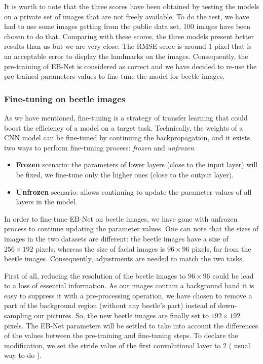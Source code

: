 \documentclass[review]{elsarticle}
\begin{document}
It is worth to note that the three scores have been obtained by
testing the models on a private set of images that are not freely
available. To do the test, we have had to use some images getting from
the public data set, $100$ images have been chosen to do that. Comparing with these scores, the three
models present better results than us but we are very close. The RMSE
score is around 1 pixel that is an acceptable error to display the
landmarks on the images. Consequently, the pre-training of EB-Net is
considered as correct and we have decided to re-use the pre-trained
parameters values to fine-tune the model for beetle images.


\subsubsection{Fine-tuning on beetle images}
As we have mentioned, fine-tuning is a strategy of transfer learning
that could boost the efficiency of a model on a target
task. Technically, the weights of a CNN model can be fine-tuned by
continuing the backpropagation, and it exists two ways to perform
fine-tuning process: \textit{frozen} and \textit{unfrozen}.

\begin{itemize}
	\item \textbf{Frozen} scenario: the parameters of lower layers (close to the input layer) will be fixed, we fine-tune only the higher ones (close to the output layer).
	\item \textbf{Unfrozen} scenario: allows continuing to update the parameter values of all layers in the model.
\end{itemize}

In order to fine-tune EB-Net on beetle images, we have gone with
unfrozen process to continue updating the parameter values. One can
note that the sizes of images in the two datasets are different: the
beetle images have a size of $256 \times 192$ pixels; whereas the size
of facial images is $96 \times 96$ pixels, far from the beetle images. Consequently, adjustments are
needed to match the two tasks.


First of all, reducing the resolution of the beetle images to $96
\times 96$ could be lead to a loss of essential information. As our
images contain a background band it is easy to suppress it with a pre-processing operation, we have chosen to remove a part of the background region (without any beetle's part) instead of down-sampling our pictures. So, the new beetle images are finally set to $192 \times 192$ pixels. The EB-Net parameters will be settled to take into account the differences of the values between the pre-training and fine-tuning steps. To declare the modification, we set the stride value of the first convolutional layer to $2$ ( usual way to do \cite{yosinski2014transferable}). 
\end{document}
